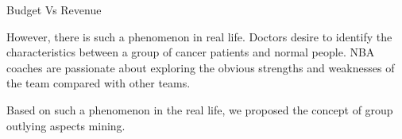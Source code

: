 \documentclass[
 size=12pt,
 paper=smartboard,  %
 mode=present, 		%
 display=slides, 	%
 style=tuliplab,  	%
 pauseslide,
 fleqn,leqno]{powerdot}
\begin{document}
\begin{slide}{Budget Vs Revenue}
\begin{note}
However,
there is such a phenomenon in real life.
Doctors desire to identify the characteristics between
a group of cancer patients and normal people.
NBA coaches are passionate about exploring the obvious strengths and
weaknesses of the team compared with other teams.

Based on such a phenomenon in the real life,
we proposed the concept of group outlying aspects mining.
\end{note}

\end{slide}
\end{document}
